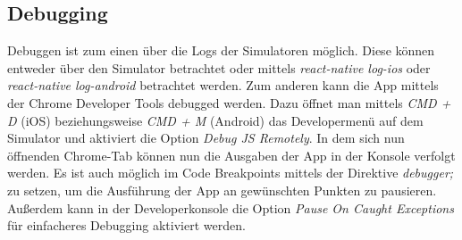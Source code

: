 \subsection{Debugging}
Debuggen ist zum einen über die Logs der Simulatoren möglich. Diese können entweder über den Simulator betrachtet oder mittels \textit{react-native log-ios} oder \textit{react-native log-android} betrachtet werden. Zum anderen kann die App mittels der Chrome Developer Tools debugged werden. Dazu öffnet man mittels \textit{CMD + D} (iOS) beziehungsweise \textit{CMD + M} (Android) das Developermenü auf dem Simulator und aktiviert die Option \textit{Debug JS Remotely}. In dem sich nun öffnenden Chrome-Tab können nun die Ausgaben der App in der Konsole verfolgt werden. Es ist auch möglich im Code Breakpoints mittels der Direktive \textit{debugger;} zu setzen, um die Ausführung der App an gewünschten Punkten zu pausieren. Außerdem kann in der Developerkonsole die Option \textit{Pause On Caught Exceptions} für einfacheres Debugging aktiviert werden.